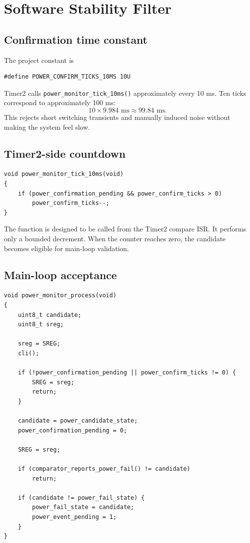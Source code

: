 \documentclass[11pt,a4paper]{article}
\begin{document}
\section{Software Stability Filter}

\subsection{Confirmation time constant}
The project constant is
\begin{lstlisting}[style=cstyle]
#define POWER_CONFIRM_TICKS_10MS 10U
\end{lstlisting}
Timer2 calls \texttt{power\_monitor\_tick\_10ms()} approximately every 10 ms. Ten ticks correspond to approximately 100 ms:
\[
10\times9.984\text{ ms}\approx99.84\text{ ms}.
\]
This rejects short switching transients and manually induced noise without making the system feel slow.

\subsection{Timer2-side countdown}

\begin{lstlisting}[style=cstyle]
void power_monitor_tick_10ms(void)
{
    if (power_confirmation_pending && power_confirm_ticks > 0)
        power_confirm_ticks--;
}
\end{lstlisting}

The function is designed to be called from the Timer2 compare ISR. It performs only a bounded decrement. When the counter reaches zero, the candidate becomes eligible for main-loop validation.

\subsection{Main-loop acceptance}

\begin{lstlisting}[style=cstyle,caption={Candidate validation and acceptance.}]
void power_monitor_process(void)
{
    uint8_t candidate;
    uint8_t sreg;

    sreg = SREG;
    cli();

    if (!power_confirmation_pending || power_confirm_ticks != 0) {
        SREG = sreg;
        return;
    }

    candidate = power_candidate_state;
    power_confirmation_pending = 0;

    SREG = sreg;

    if (comparator_reports_power_fail() != candidate)
        return;

    if (candidate != power_fail_state) {
        power_fail_state = candidate;
        power_event_pending = 1;
    }
}
\end{lstlisting}
\end{document}
